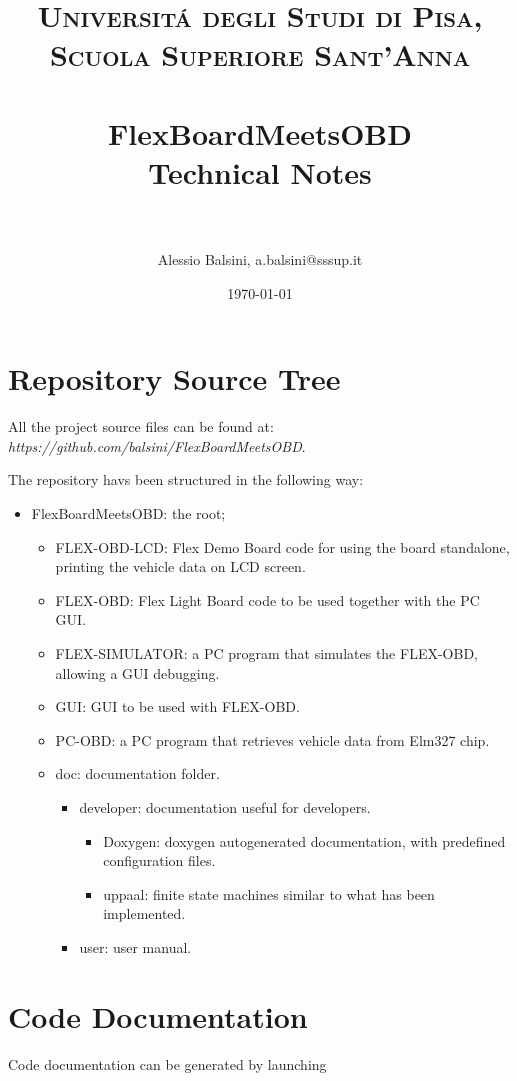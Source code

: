 \documentclass[paper=a4, fontsize=11pt]{scrartcl} %
\title{	
\normalfont \normalsize 
\textsc{Universit\'a degli Studi di Pisa, Scuola Superiore Sant'Anna} \\ [25pt] %
\horrule{0.5pt} \\[0.4cm] %
\huge FlexBoardMeetsOBD \\ %
\large Technical Notes \\
\horrule{2pt} \\[0.5cm] %
}
\author{Alessio Balsini, a.balsini@sssup.it} %
\date{\normalsize\today} %
\numberwithin{equation}{section} %
\numberwithin{figure}{section} %
\numberwithin{table}{section} %
\begin{document}
\maketitle %

\section{Repository Source Tree}

All the project source files can be found at: \emph{https://github.com/balsini/FlexBoardMeetsOBD}.

The repository havs been structured in the following way:

\begin{itemize}
	\item FlexBoardMeetsOBD: the root;
		\begin{itemize}
		\item FLEX-OBD-LCD: Flex Demo Board code for using the board standalone, printing the vehicle data on LCD screen.
		\item FLEX-OBD: Flex Light Board code to be used together with the PC GUI.
		\item FLEX-SIMULATOR: a PC program that simulates the FLEX-OBD, allowing a GUI debugging.
		\item GUI: GUI to be used with FLEX-OBD.
		\item PC-OBD: a PC program that retrieves vehicle data from Elm327 chip.
		\item doc: documentation folder.
		\begin{itemize}
			\item developer: documentation useful for developers.
			\begin{itemize}
				\item Doxygen: doxygen autogenerated documentation, with predefined configuration files.
				\item uppaal: finite state machines similar to what has been implemented.
			\end{itemize}
			\item user: user manual.
		\end{itemize}
		\end{itemize}
\end{itemize}

\section{Code Documentation}

Code documentation can be generated by launching
\end{document}
